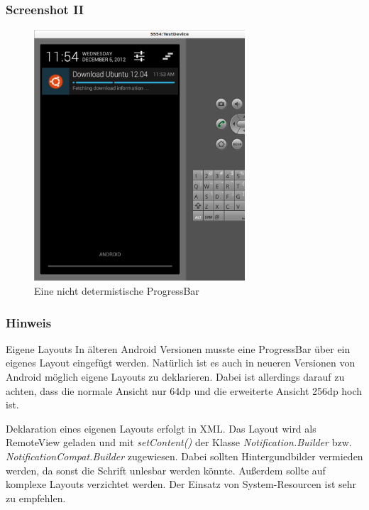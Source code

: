 \begin{frame}
   \frametitle{Screenshot II}
   \begin{figure}[h!]
     \centering
     \includegraphics[width=0.7\textwidth]{pictures/indeterminateProgress.ps}
     \caption{
        Eine nicht determistische ProgressBar
     }
     \label{fig:indeterminateProgress}
   \end{figure}
\end{frame}

\begin{frame}
   \frametitle{Hinweis}
   \begin{alertblock}{Eigene Layouts}
      In älteren Android Versionen musste eine ProgressBar über ein eigenes Layout eingefügt werden. 
      Natürlich ist es auch in neueren Versionen von Android möglich eigene Layouts zu deklarieren. 
      Dabei ist allerdings darauf zu achten, dass die normale Ansicht 
      nur 64dp und die erweiterte Ansicht 256dp hoch ist.

      \vspace{5mm}

      Deklaration eines eigenen Layouts erfolgt in XML. Das Layout wird als RemoteView 
      geladen und mit \emph{setContent()} der Klasse \emph{Notification.Builder} bzw. 
      \emph{NotificationCompat.Builder} zugewiesen. Dabei sollten 
      Hintergundbilder vermieden werden, da sonst die Schrift unlesbar werden könnte. 
      Außerdem sollte auf komplexe Layouts verzichtet werden. Der Einsatz von 
      System-Resourcen ist sehr zu empfehlen.
   \end{alertblock}
\end{frame}
